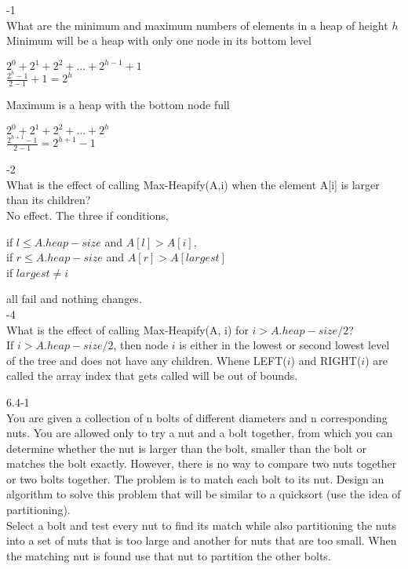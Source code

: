 \documentclass[12pt,largemargins]{homework}
\begin{document}
\maketitle
{}-1\\
What are the minimum and maximum numbers of elements in a heap of height $ h $\\
Minimum will be a heap with only one node in its bottom level\\
\begin{center}
$ 2^0 + 2^1 + 2^2 + ... + 2^{h-1} + 1 $\\
$ \frac{2^{h} - 1 }{2 - 1} + 1 = 2^h$\\
\end{center}
Maximum is a heap with the bottom node full\\
\begin{center}
$ 2^0 + 2^1 + 2^2 + ... + 2^{h}$\\
$ \frac{2^{h+1} - 1}{2 - 1}  = 2^{h + 1} -1$\\
\end{center}
-2\\
What is the effect of calling Max-Heapify(A,i) when the element A[i] is larger than its children?\\

No effect. The three if conditions,
\begin{center}
if $ l \leq A.heap - size $ and $ A[l] >A[i] $,\\
if $ r \leq A.heap - size $ and $ A[r] > A[largest] $\\
if $ largest \neq i $ \\
\end{center}
all fail and nothing changes.\\

-4\\
What is the effect of calling Max-Heapify(A, i) for $ i > A.heap-size/2$?\\

If $ i > A.heap-size/2 $, then node $ i $ is either in the lowest or second lowest level of the tree and does not have any children. Whene LEFT($ i $) and RIGHT($ i $) are called the array index that gets called will be out of bounds.\\

\question

6.4-1\\

\question
You are given a collection of n bolts of different diameters and n corresponding nuts. You are allowed only to try a nut and a bolt together, from which you can determine whether the nut is larger than the bolt, smaller than the bolt or matches the bolt exactly. However, there is no way to compare two nuts together or two bolts together. The problem is to match each bolt to its nut. Design an algorithm to solve this problem that will be similar to a quicksort (use the idea of partitioning).\\ 
Select a bolt and test every nut to find its match while also partitioning the nuts into a set of nuts that is too large and another for nuts that are too small. When the matching nut is found use that nut to partition the other bolts.
\end{document}
